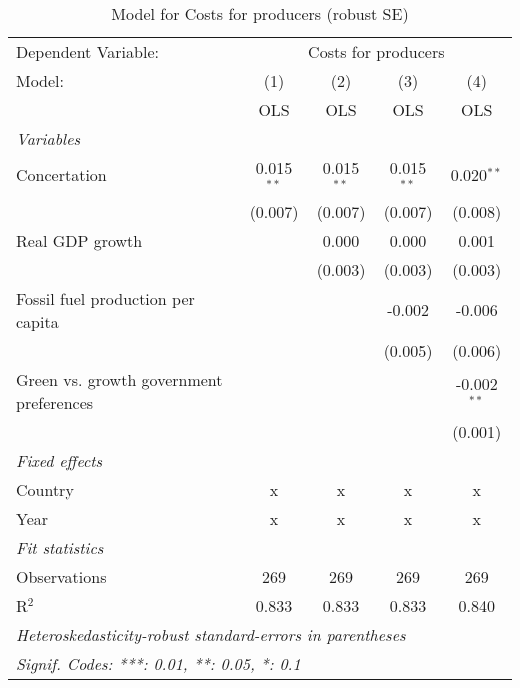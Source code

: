 
\begin{table}[htbp]
   \caption{Model for Costs for producers (robust SE)}
   \centering
   \begin{tabular}{lcccc}
      \toprule
      Dependent Variable: & \multicolumn{4}{c}{Costs for producers}\\
      Model:                                  & (1)          & (2)          & (3)          & (4)\\  
                                              &  OLS         & OLS          & OLS          & OLS\\  
      \midrule
      \emph{Variables}\\
      Concertation                            & 0.015$^{**}$ & 0.015$^{**}$ & 0.015$^{**}$ & 0.020$^{**}$\\   
                                              & (0.007)      & (0.007)      & (0.007)      & (0.008)\\   
      Real GDP growth                         &              & 0.000        & 0.000        & 0.001\\   
                                              &              & (0.003)      & (0.003)      & (0.003)\\   
      Fossil fuel production per capita       &              &              & -0.002       & -0.006\\   
                                              &              &              & (0.005)      & (0.006)\\   
      Green vs. growth government preferences &              &              &              & -0.002$^{**}$\\   
                                              &              &              &              & (0.001)\\   
      \emph{Fixed effects}\\
      Country                                 & x            & x            & x            & x\\  
      Year                                    & x            & x            & x            & x\\  
      \midrule \emph{Fit statistics}\\
      Observations                            & 269          & 269          & 269          & 269\\  
      R$^2$                                   & 0.833        & 0.833        & 0.833        & 0.840\\  
      \midrule
      \multicolumn{5}{l}{\emph{Heteroskedasticity-robust standard-errors in parentheses}}\\
      \multicolumn{5}{l}{\emph{Signif. Codes: ***: 0.01, **: 0.05, *: 0.1}}\\
   \end{tabular}
\end{table}


